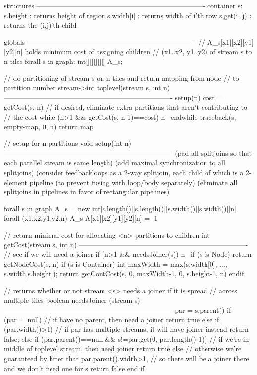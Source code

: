 structures
-------------------------------------------------------------------------
container s:
  s.height       : returns height of region
  s.width[i]     : returns width of i'th row
  s.get(i, j)    : returns the (i,j)'th child

globals
-------------------------------------------------------------------------
// A_s[x1][x2][y1][y2][n] holds minimum cost of assigning children 
// (x1..x2, y1..y2) of stream s to n tiles
forall s in graph:  int[][][][][] A_s;

// do partitioning of stream s on n tiles and return mapping from node
// to partition number
stream->int toplevel(stream s, int n)
-------------------------------------------------------------------------
setup(n)
cost = getCost(s, n)
// if desired, eliminate extra partitions that aren't contributing to
// the cost
while (n>1 && getCost(s, n-1)==cost)
  n--
endwhile
traceback(s, empty-map, 0, n)
return map

// setup for n partitions
void setup(int n) 
-------------------------------------------------------------------------
(pad all splitjoins so that each parallel stream is same length)
(add maximal synchronization to all splitjoins)
(consider feedbackloops as a 2-way splitjoin, each child of which is a
 2-element pipeline (to prevent fusing with loop/body separately)
(eliminate all splitjoins in pipelines in favor of rectangular pipelines)

forall s in graph
  A_s = new int[s.length()][s.length()][s.width()][s.width()][n]
  forall (x1,x2,y1,y2,n) \in A_s
    A[x1][x2][y1][y2][n] = -1

// return minimal cost for allocating <n> partitions to children
int getCost(stream s, int n)
-------------------------------------------------------------------------
// see if we will need a joiner
if (n>1 && needsJoiner(s)) 
  n--
if (s is Node)
  return getNodeCost(s, n)
if (s is Container)
  int maxWidth = max(s.width[0], ..., s.width[s.height]);
  return getContCost(s, 0, maxWidth-1, 0, s.height-1, n)
endif

// returns whether or not stream <s> needs a joiner if it is spread
// across multiple tiles
boolean needsJoiner (stream s)
-------------------------------------------------------------------------
par = s.parent()
if (par==null)
  // if have no parent, then need a joiner
  return true
else if (par.width()>1)
  // if par has multiple streams, it will have joiner instead
  return false;
else if (par.parent()==null && s!=par.get(0, par.length()-1))
  // if we're in middle of toplevel stream, then need joiner
  return true
else
  // otherwise we're guaranteed by lifter that par.parent().width>1,
  // so there will be a joiner there and we don't need one for s
  return false
end if
